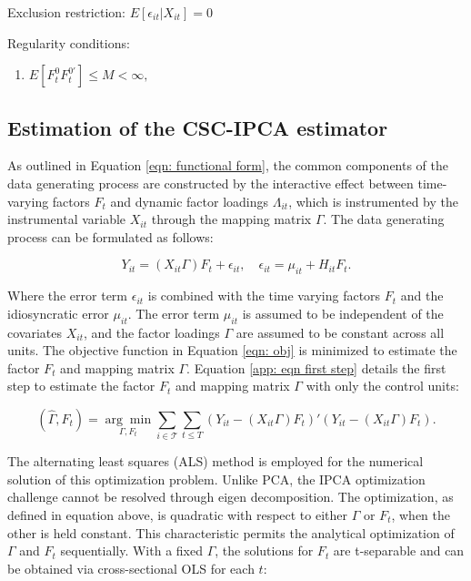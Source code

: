 \documentclass[12pt]{article}
\begin{document}
\begin{assumption}
Exclusion restriction: $E[\epsilon_{it}|X_{it}]=0$
\end{assumption}

\begin{assumption}
Regularity conditions:
\begin{enumerate}
    \item $E\left[F_t^0 F_t^{0'}\right] \leq M < \infty,$
\end{enumerate}
\end{assumption}

\subsection{Estimation of the CSC-IPCA estimator}
\label{sec: appendix estimation}

As outlined in Equation \ref{eqn: functional form}, the common components of the data generating process are constructed by the interactive effect between time-varying factors $F_t$ and dynamic factor loadings $\Lambda_{it}$, which is instrumented by the instrumental variable $X_{it}$ through the mapping matrix $\Gamma$. The data generating process can be formulated as follows:

\begin{equation}
\label{app: eqn combined}
Y_{it} = (X_{it}\Gamma) F_{t} + \epsilon_{it}, \quad \epsilon_{it} = \mu_{it} + H_{it} F_t.
\end{equation}

\noindent Where the error term $\epsilon_{it}$ is combined with the time varying factors $F_t$ and the idiosyncratic error $\mu_{it}$. The error term $\mu_{it}$ is assumed to be independent of the covariates $X_{it}$, and the factor loadings $\Gamma$ are assumed to be constant across all units. The objective function in Equation \ref{eqn: obj} is minimized to estimate the factor $F_t$ and mapping matrix $\Gamma$. Equation \ref{app: eqn first step} details the first step to estimate the factor $F_t$ and mapping matrix $\Gamma$ with only the control units:

\begin{equation}
\label{app: eqn first step}
(\hat{\Gamma}, \hat{F}_t) = \underset{\Gamma, F_t}{\arg\min} \sum_{i \in \mathcal{T}} \sum_{t \leq T} \left( Y_{it} - (X_{it}\Gamma) F_{t} \right)' \left( Y_{it} - (X_{it}\Gamma) F_{t} \right).
\end{equation}

The alternating least squares (ALS) method is employed for the numerical solution of this optimization problem. Unlike PCA, the IPCA optimization challenge cannot be resolved through eigen decomposition. The optimization, as defined in equation above, is quadratic with respect to either $\Gamma$ or $F_t$, when the other is held constant. This characteristic permits the analytical optimization of $\Gamma$ and $F_t$ sequentially. With a fixed $\Gamma$, the solutions for $F_t$ are t-separable and can be obtained via cross-sectional OLS for each $t$:
\end{document}
